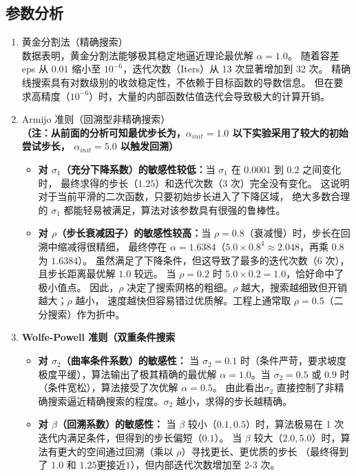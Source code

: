 \documentclass[12pt,a4paper]{ctexart}
\begin{document}
\subsection{参数分析}
\begin{enumerate}
	\item 黄金分割法（精确搜索）\\
	数据表明，黄金分割法能够极其稳定地逼近理论最优解 $\alpha = 1.0$。
	随着容差 eps 从 $0.01$ 缩小至 $10^{-6}$，迭代次数（Iters）从 13 次显著增加到 32 次。
	精确线搜索具有对数级别的收敛稳定性，不依赖于目标函数的导数信息。
	但在要求高精度（$10^{-6}$）时，大量的内部函数估值迭代会导致极大的计算开销。

	\item Armijo 准则（回溯型非精确搜索）\\
	\textbf{（注：从前面的分析可知最优步长为，$\alpha_{init} = 1.0$
	以下实验采用了较大的初始尝试步长， $\alpha_{init} = 5.0$ 以触发回溯）}\\
	\begin{itemize}
		\item \textbf{对 $\sigma_1$（充分下降系数）的敏感性较低：}当 $\sigma_1$ 在 $0.0001$ 到 $0.2$ 之间变化时，
		最终求得的步长（$1.25$）和迭代次数（$3$ 次）完全没有变化。
		这说明对于当前平滑的二次函数，只要初始步长进入了下降区域，
		绝大多数合理的 $\sigma_1$ 都能轻易被满足，算法对该参数具有很强的鲁棒性。
		\item \textbf{对 $\rho$（步长衰减因子）的敏感性较高：}当 $\rho = 0.8$（衰减慢）时，步长在回溯中缩减得很精细，
		最终停在 $\alpha = 1.6384$（$5.0 \times 0.8^4 \approx 2.048$，再乘 $0.8$ 为 $1.6384$）。
		虽然满足了下降条件，但这导致了最多的迭代次数（6 次），且步长距离最优解 $1.0$ 较远。
		当 $\rho = 0.2$ 时 $5.0 \times 0.2 = 1.0$，恰好命中了极小值点。
		因此，$\rho$ 决定了搜索网格的粗细。$\rho$ 越大，搜索越细致但开销越大；$\rho$ 越小，
		速度越快但容易错过优质解。工程上通常取 $\rho = 0.5$（二分搜索）作为折中。
	\end{itemize}

	\item \textbf{Wolfe-Powell 准则（双重条件搜索} \\
	\begin{itemize}
		\item \textbf{对 $\sigma_2$（曲率条件系数）的敏感性：}
		当 $\sigma_2 = 0.1$ 时（条件严苛，要求坡度极度平缓），算法输出了极其精确的最优解
		$\alpha = 1.0$。当 $\sigma_2 = 0.5$ 或 $0.9$ 时（条件宽松），算法接受了次优解 $\alpha = 0.5$。
		由此看出$\sigma_2$ 直接控制了非精确搜索逼近精确搜索的程度。$\sigma_2$ 越小，求得的步长越精确。
		\item \textbf{对 $\beta$（回溯系数）的敏感性：}
		当 $\beta$ 较小（$0.1, 0.5$）时，算法极易在 1 次迭代内满足条件，但得到的步长偏短（$0.1$）。
		当 $\beta$ 较大（$2.0, 5.0$）时，算法有更大的空间通过回溯（乘以 $\rho$）寻找更长、更优质的步长
		（最终得到了 $1.0$ 和 $1.25$更接近$1$），但内部迭代次数增加至 2-3 次。
	\end{itemize}
	
\end{enumerate}
\end{document}
